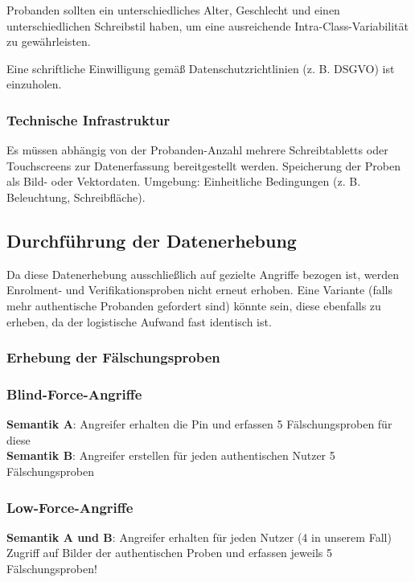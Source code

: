 \documentclass{article}
\begin{document}
Probanden sollten ein unterschiedliches Alter, Geschlecht und einen unterschiedlichen Schreibstil haben, 
um eine ausreichende Intra-Class-Variabilität zu gewährleisten.

Eine schriftliche Einwilligung gemäß Datenschutzrichtlinien (z. B. DSGVO) ist einzuholen.

\subsubsection{Technische Infrastruktur}
Es müssen abhängig von der Probanden-Anzahl mehrere Schreibtabletts oder Touchscreens zur Datenerfassung bereitgestellt werden.
Speicherung der Proben als Bild- oder Vektordaten.
Umgebung: Einheitliche Bedingungen (z. B. Beleuchtung, Schreibfläche).

\subsection{Durchführung der Datenerhebung}

Da diese Datenerhebung ausschließlich auf gezielte Angriffe bezogen ist, werden Enrolment- und 
Verifikationsproben nicht erneut erhoben. Eine Variante (falls mehr authentische Probanden gefordert sind) 
könnte sein, diese ebenfalls zu erheben, da der logistische Aufwand fast identisch ist.

\subsubsection{Erhebung der Fälschungsproben}

\subsubsection*{Blind-Force-Angriffe}

\begin{flushleft}
	\textbf{Semantik A}: Angreifer erhalten die Pin und erfassen 5 Fälschungsproben für diese\\
	\textbf{Semantik B}: Angreifer erstellen für jeden authentischen Nutzer 5 Fälschungsproben	
\end{flushleft}


\subsubsection*{Low-Force-Angriffe}

\textbf{Semantik A und B}: Angreifer erhalten für jeden Nutzer (4 in unserem Fall) Zugriff auf Bilder der 
authentischen Proben und erfassen jeweils 5 Fälschungsproben!
\end{document}
